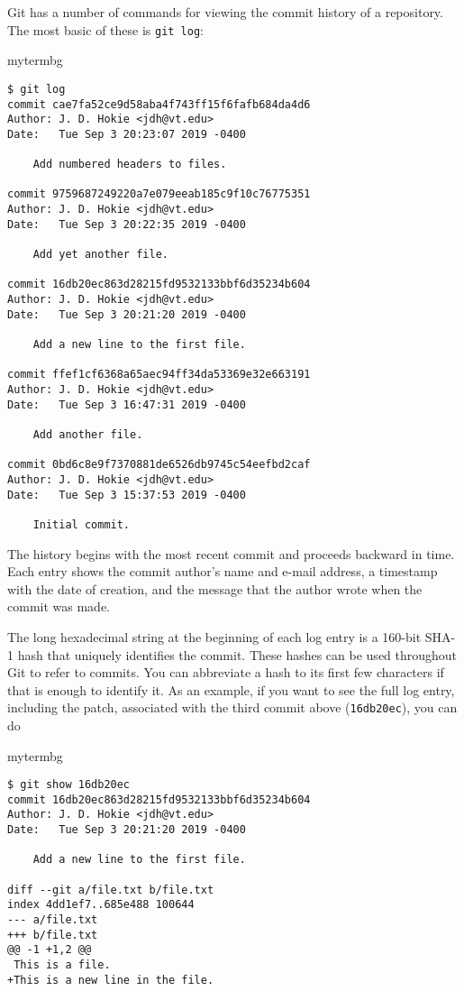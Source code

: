 Git has a number of commands for viewing the commit history of a repository.
The most basic of these is \texttt{git log}:

\begin{tsession}{mytermbg}
\begin{verbatim}
$ git log
commit cae7fa52ce9d58aba4f743ff15f6fafb684da4d6
Author: J. D. Hokie <jdh@vt.edu>
Date:   Tue Sep 3 20:23:07 2019 -0400

    Add numbered headers to files.

commit 9759687249220a7e079eeab185c9f10c76775351
Author: J. D. Hokie <jdh@vt.edu>
Date:   Tue Sep 3 20:22:35 2019 -0400

    Add yet another file.

commit 16db20ec863d28215fd9532133bbf6d35234b604
Author: J. D. Hokie <jdh@vt.edu>
Date:   Tue Sep 3 20:21:20 2019 -0400

    Add a new line to the first file.

commit ffef1cf6368a65aec94ff34da53369e32e663191
Author: J. D. Hokie <jdh@vt.edu>
Date:   Tue Sep 3 16:47:31 2019 -0400

    Add another file.

commit 0bd6c8e9f7370881de6526db9745c54eefbd2caf
Author: J. D. Hokie <jdh@vt.edu>
Date:   Tue Sep 3 15:37:53 2019 -0400

    Initial commit.

\end{verbatim}
\end{tsession}

The history begins with the most recent commit and proceeds backward in time.
Each entry shows the commit author's name and e-mail address, a timestamp with
the date of creation, and the message that the author wrote when the commit was
made.

The long hexadecimal string at the beginning of each log entry is a 160-bit
SHA-1 hash that uniquely identifies the commit.  These hashes can be used
throughout Git to refer to commits.  You can abbreviate a hash to its first few
characters if that is enough to identify it.  As an example, if you want to see
the full log entry, including the patch, associated with the third commit above
(\texttt{16db20ec}), you can do

\begin{tsession}{mytermbg}
\begin{verbatim}
$ git show 16db20ec
commit 16db20ec863d28215fd9532133bbf6d35234b604
Author: J. D. Hokie <jdh@vt.edu>
Date:   Tue Sep 3 20:21:20 2019 -0400

    Add a new line to the first file.

diff --git a/file.txt b/file.txt
index 4dd1ef7..685e488 100644
--- a/file.txt
+++ b/file.txt
@@ -1 +1,2 @@
 This is a file.
+This is a new line in the file.
\end{verbatim}
\end{tsession}

